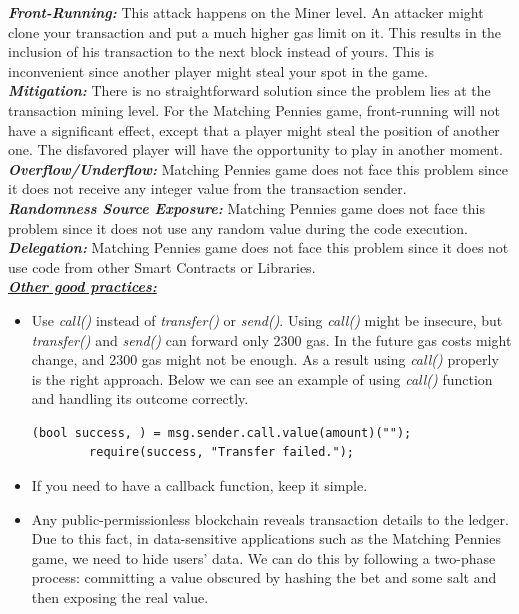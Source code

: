\documentclass[12pt,a4paper]{article}
\begin{document}
\textbf{\emph{Front-Running: }}This attack happens on the Miner level. An
attacker might clone your transaction and put a much higher gas limit on it.
This results in the inclusion of his transaction to the next block instead of
yours. This is inconvenient since another player might steal your spot in the
game. \\

\textbf{\emph{Mitigation: }}There is no straightforward solution since the
problem lies at the transaction mining level. For the Matching Pennies game,
front-running will not have a significant effect, except that a player might
steal the position of another one. The disfavored player will have the
opportunity to play in another moment. \\

\textbf{\emph{Overflow/Underflow: }}Matching Pennies game does not face this
problem since it does not receive any integer value from the transaction sender.
\\

\textbf{\emph{Randomness Source Exposure: }}Matching Pennies game does not face
this problem since it does not use any random value during the code execution.
\\

\textbf{\emph{Delegation: }}Matching Pennies game does not face this problem
since it does not use code from other Smart Contracts or Libraries. \\

\textbf{\emph{\underline{Other good practices:}}} \\ 

\begin{itemize}
    \item Use \emph{call()} instead of \emph{transfer()} or \emph{send()}. Using
    \emph{call()}  might be insecure, but \emph{transfer()} and \emph{send()}
    can forward only 2300 gas. In the future gas costs might change, and 2300
    gas might not be enough. As a result using \emph{call()} properly is the
    right approach. Below we can see an example of using \emph{call()} function
    and handling its outcome correctly.\\
    \begin{lstlisting}[language=Solidity]
        (bool success, ) = msg.sender.call.value(amount)(""); 
        require(success, "Transfer failed.");
    \end{lstlisting}
    \item If you need to have a callback function, keep it simple.
    \item Any public-permissionless blockchain reveals transaction details to 
    the ledger. Due to this fact, in data-sensitive applications such as the
    Matching Pennies game, we need to hide users' data. We can do this by following a
    two-phase process: committing a value obscured by hashing the bet and some salt
    and then exposing the real value.
\end{itemize}
\end{document}
